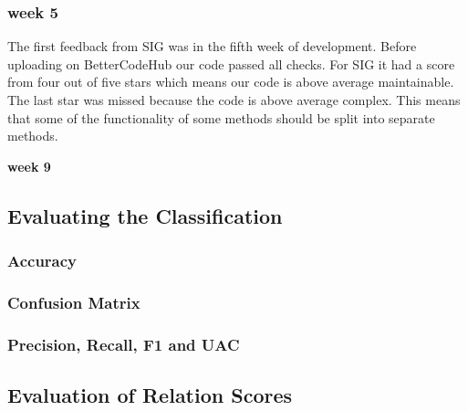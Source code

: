 \subsubsection{week 5}
The first feedback from SIG was in the fifth week of development. Before uploading on BetterCodeHub our code passed all checks. For SIG it had a score from four out of five stars which means our code is above average maintainable. The last star was missed because the code is above average complex. This means that some of the functionality of some methods should be split into separate methods.

\textbf{week 9} \\



\subsection{Evaluating the Classification}
\subsubsection{Accuracy}

\subsubsection{Confusion Matrix}

\subsubsection{Precision, Recall, F1 and UAC}


\subsection{Evaluation of Relation Scores}


